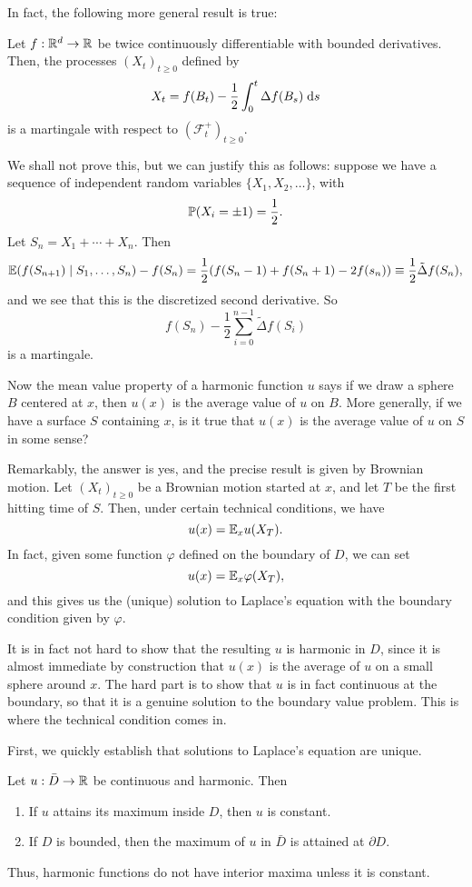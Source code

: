 \documentclass[a4paper]{article}
\begin{document}
In fact, the following more general result is true:
\begin{thm}
  Let $f: \R^d \to \R$ be twice continuously differentiable with bounded derivatives. Then, the processes $(X_t)_{t \geq 0}$ defined by
  \[
    X_t = f(B_t) - \frac{1}{2} \int_0^t \Delta f(B_s)\;\d s
  \]
  is a martingale with respect to $(\mathcal{F}_t^+)_{t \geq 0}$.
\end{thm}
We shall not prove this, but we can justify this as follows: suppose we have a sequence of independent random variables $\{X_1, X_2, \ldots\}$, with
\[
  \P(X_i = \pm 1) = \frac{1}{2}.
\]
Let $S_n = X_1 + \cdots + X_n$. Then
\[
  \E(f(S_{n + 1}) \mid S_1, \ldots, S_n) - f(S_n) = \frac{1}{2} (f(S_n - 1) + f(S_n + 1) - 2 f(s_n)) \equiv \frac{1}{2} \tilde{\Delta} f(S_n),
\]
and we see that this is the discretized second derivative. So
\[
  f(S_n) - \frac{1}{2} \sum_{i = 0}^{n - 1} \tilde{\Delta} f(S_i)
\]
is a martingale.

Now the mean value property of a harmonic function $u$ says if we draw a sphere $B$ centered at $x$, then $u(x)$ is the average value of $u$ on $B$. More generally, if we have a surface $S$ containing $x$, is it true that $u(x)$ is the average value of $u$ on $S$ in some sense?

Remarkably, the answer is yes, and the precise result is given by Brownian motion. Let $(X_t)_{t \geq 0}$ be a Brownian motion started at $x$, and let $T$ be the first hitting time of $S$. Then, under certain technical conditions, we have
\[
  u(x) = \E_x u(X_T).
\]
In fact, given some function $\varphi$ defined on the boundary of $D$, we can set
\[
  u(x) = \E_x \varphi(X_T),
\]
and this gives us the (unique) solution to Laplace's equation with the boundary condition given by $\varphi$.

It is in fact not hard to show that the resulting $u$ is harmonic in $D$, since it is almost immediate by construction that $u(x)$ is the average of $u$ on a small sphere around $x$. The hard part is to show that $u$ is in fact continuous at the boundary, so that it is a genuine solution to the boundary value problem. This is where the technical condition comes in.

First, we quickly establish that solutions to Laplace's equation are unique.
\begin{defi}
  Let $u: \bar{D} \to \R$ be continuous and harmonic. Then
  \begin{enumerate}
    \item If $u$ attains its maximum inside $D$, then $u$ is constant.
    \item If $D$ is bounded, then the maximum of $u$ in $\bar{D}$ is attained at $\partial D$.
  \end{enumerate}
\end{defi}
Thus, harmonic functions do not have interior maxima unless it is constant.
\end{document}
